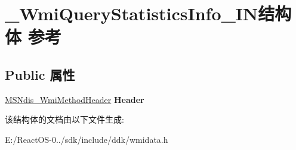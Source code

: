 \hypertarget{struct___wmi_query_statistics_info___i_n}{}\section{\+\_\+\+Wmi\+Query\+Statistics\+Info\+\_\+\+I\+N结构体 参考}
\label{struct___wmi_query_statistics_info___i_n}
\subsection*{Public 属性}
\begin{DoxyCompactItemize}
\item 
\mbox{\label{struct___wmi_query_statistics_info___i_n_a9763dc79d9ba44fdd2e94a675db347cd}} 
\hyperlink{struct___m_s_ndis___wmi_method_header}{M\+S\+Ndis\+\_\+\+Wmi\+Method\+Header} {\bfseries Header}
\end{DoxyCompactItemize}


该结构体的文档由以下文件生成\+:\begin{DoxyCompactItemize}
\item 
E\+:/\+React\+O\+S-\/0../sdk/include/ddk/wmidata.\+h\end{DoxyCompactItemize}
